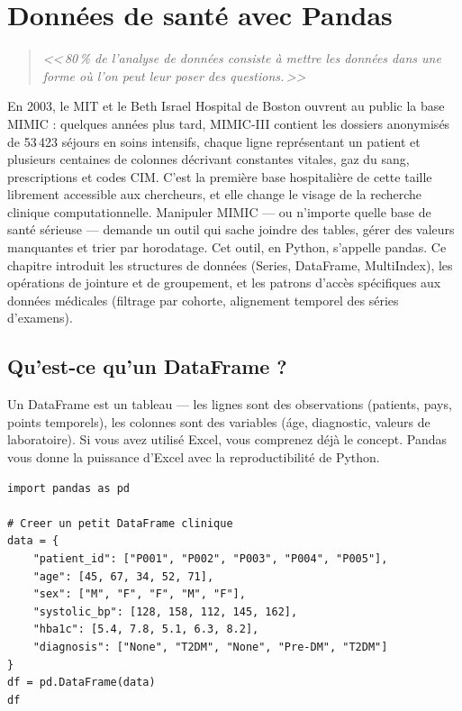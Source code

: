 \chapter{Donn\'ees de sant\'e avec Pandas}
\label{ch:pandas}

\begin{quote}
\emph{<<\,80\,\% de l'analyse de donn\'ees consiste \`a mettre les donn\'ees dans une forme o\`u l'on peut leur poser des questions.\,>>}
\end{quote}

En 2003, le MIT et le Beth Israel Hospital de Boston ouvrent au public la base MIMIC : quelques années plus tard, MIMIC-III contient les dossiers anonymisés de 53\,423 séjours en soins intensifs, chaque ligne représentant un patient et plusieurs centaines de colonnes décrivant constantes vitales, gaz du sang, prescriptions et codes CIM. C'est la première base hospitalière de cette taille librement accessible aux chercheurs, et elle change le visage de la recherche clinique computationnelle. Manipuler MIMIC --- ou n'importe quelle base de santé sérieuse --- demande un outil qui sache joindre des tables, gérer des valeurs manquantes et trier par horodatage. Cet outil, en Python, s'appelle pandas. Ce chapitre introduit les structures de données (Series, DataFrame, MultiIndex), les opérations de jointure et de groupement, et les patrons d'accès spécifiques aux données médicales (filtrage par cohorte, alignement temporel des séries d'examens).

\section{Qu'est-ce qu'un DataFrame ?}

Un DataFrame est un tableau --- les lignes sont des observations (patients, pays, points temporels), les colonnes sont des variables (\'age, diagnostic, valeurs de laboratoire). Si vous avez utilis\'e Excel, vous comprenez d\'ej\`a le concept. Pandas vous donne la puissance d'Excel avec la reproductibilit\'e de Python.

\begin{verbatim}
import pandas as pd

# Creer un petit DataFrame clinique
data = {
    "patient_id": ["P001", "P002", "P003", "P004", "P005"],
    "age": [45, 67, 34, 52, 71],
    "sex": ["M", "F", "F", "M", "F"],
    "systolic_bp": [128, 158, 112, 145, 162],
    "hba1c": [5.4, 7.8, 5.1, 6.3, 8.2],
    "diagnosis": ["None", "T2DM", "None", "Pre-DM", "T2DM"]
}
df = pd.DataFrame(data)
df
\end{verbatim}

